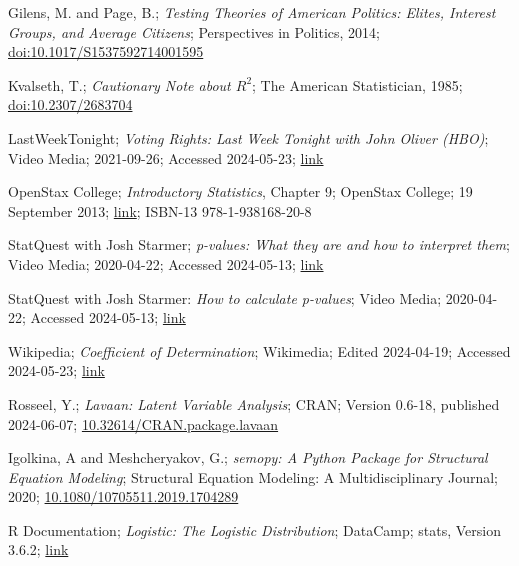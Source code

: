 \begin{thebibliography}{9}
	 Gilens, M. and Page, B.; \textit{Testing Theories of American Politics:	Elites, Interest Groups, and Average Citizens}; Perspectives in Politics, 2014; \href{https://doi.org/10.1017/S1537592714001595}{doi:10.1017/S1537592714001595}
	
	 Kvalseth, T.; \textit{Cautionary Note about $R^2$}; The American Statistician, 1985; \href{https://sci-hub.ru/https://doi.org/10.2307/2683704}{doi:10.2307/2683704}
	
	 LastWeekTonight; \textit{Voting Rights: Last Week Tonight with John Oliver (HBO)}; Video Media; 2021-09-26; Accessed 2024-05-23; \href{https://www.youtube.com/watch?v=EN9OdruH_qM}{link}
	
	 OpenStax College; \textit{Introductory Statistics}, Chapter 9; OpenStax College; 19 September 2013; \href{http://cnx.org/content/col11562/latest/}{link}; ISBN-13 978-1-938168-20-8
	
	 StatQuest with Josh Starmer; \textit{p-values: What they are and how to interpret them}; Video Media; 2020-04-22; Accessed 2024-05-13; \href{https://youtu.be/vemZtEM63GY?si=16kgerT8beT_EkOc}{link}
	
	 StatQuest with Josh Starmer: \textit{How to calculate p-values}; Video Media; 2020-04-22; Accessed 2024-05-13; \href{https://youtu.be/JQc3yx0-Q9E?si=M0vKNOTDjNuImq0k}{link}

	 Wikipedia; \textit{Coefficient of Determination}; Wikimedia; Edited 2024-04-19; Accessed 2024-05-23; \href{https://en.wikipedia.org/wiki/Coefficient_of_determination}{link}
	
	 Rosseel, Y.; \textit{Lavaan: Latent Variable Analysis}; CRAN; Version 0.6-18, published 2024-06-07; \href{https://cran.r-project.org/package=lavaan}{10.32614/CRAN.package.lavaan}
	
	 Igolkina, A and Meshcheryakov, G.; \textit{semopy: A Python Package for Structural Equation Modeling}; Structural Equation Modeling: A Multidisciplinary Journal; 2020; \href{https://doi.org/10.1080/10705511.2019.1704289}{10.1080/10705511.2019.1704289}
	
	 R Documentation; \textit{Logistic: The Logistic Distribution}; DataCamp; stats, Version 3.6.2; \href{https://www.rdocumentation.org/packages/stats/versions/3.6.2/topics/Logistic}{link}
\end{thebibliography}

